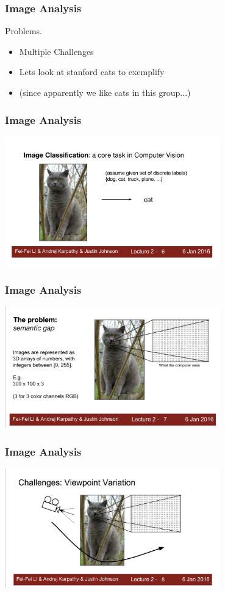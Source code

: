 \documentclass[aspectratio=169,usenames,dvipsnames]{beamer}
\begin{document}
\begin{frame}
    \frametitle{Image Analysis}
    \begin{block}{Problems.}
        \begin{itemize}
            \item Multiple Challenges
            \item Lets look at stanford cats to exemplify
            \item (since apparently we like cats in this group...)
        \end{itemize}
    \end{block}
\end{frame}

\begin{frame}
    \frametitle{Image Analysis}
    \centering
    \vspace{-1.2\baselineskip}
    \includegraphics[width=0.7\textwidth]{Figures/stn1.png}
\end{frame}
\begin{frame}
    \frametitle{Image Analysis}
    \centering
    \vspace{-1.2\baselineskip}
    \includegraphics[width=0.7\textwidth]{Figures/stn2.png}
\end{frame}
\begin{frame}
    \frametitle{Image Analysis}
    \centering
    \vspace{-1.2\baselineskip}
    \includegraphics[width=0.7\textwidth]{Figures/stn3.png}
\end{frame}
\end{document}
